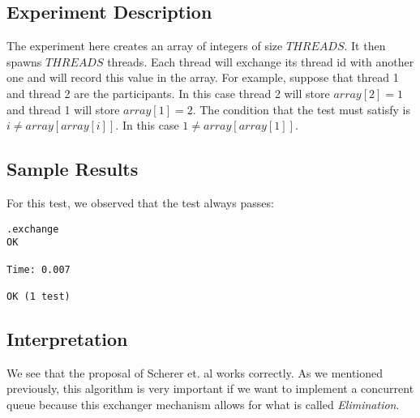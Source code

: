 \subsection{Experiment Description}
\par
The experiment here creates an array of integers of size $THREADS$. It then
spawns $THREADS$ threads. Each thread will exchange its thread id with another
one and will record this value in the array. For example, suppose that thread 1
and thread 2 are the participants. In this case thread 2 will store $array[2]=1$
and thread 1 will store $array[1]=2$. The condition that the test must satisfy
is $i \neq array[array[i]]$. In this case $1 \neq array[array[1]]$. 
\par
\subsection{Sample Results}
\par
For this test, we observed that the test always passes:
\par
\begin{verbatim}
.exchange
OK

Time: 0.007

OK (1 test)
\end{verbatim}
\par
\subsection{Interpretation}
We see that the proposal of Scherer et. al works correctly. As we mentioned
previously, this algorithm is very important if we want to implement a
concurrent queue because this exchanger mechanism allows for what is called
\textit{Elimination}.
